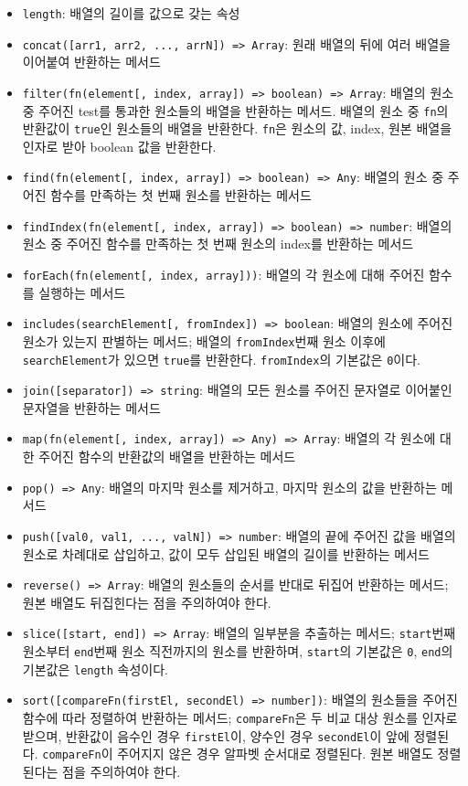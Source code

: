 \begin{itemize}
    \item \texttt{length}: 배열의 길이를 값으로 갖는 속성
    \item \texttt{concat([arr1, arr2, ..., arrN]) => Array}: 원래 배열의 뒤에 여러 배열을 이어붙여 반환하는 메서드
    \item \texttt{filter(fn(element[, index, array]) => boolean) => Array}: 배열의 원소 중 주어진 test를 통과한 원소들의 배열을 반환하는 메서드. 배열의 원소 중 \texttt{fn}의 반환값이 \texttt{true}인 원소들의 배열을 반환한다. \texttt{fn}은 원소의 값, index, 원본 배열을 인자로 받아 boolean 값을 반환한다.
    \item \texttt{find(fn(element[, index, array]) => boolean) => Any}: 배열의 원소 중 주어진 함수를 만족하는 첫 번째 원소를 반환하는 메서드
    \item \texttt{findIndex(fn(element[, index, array]) => boolean) => number}: 배열의 원소 중 주어진 함수를 만족하는 첫 번째 원소의 index를 반환하는 메서드
    \item \texttt{forEach(fn(element[, index, array]))}: 배열의 각 원소에 대해 주어진 함수를 실행하는 메서드
    \item \texttt{includes(searchElement[, fromIndex]) => boolean}: 배열의 원소에 주어진 원소가 있는지 판별하는 메서드; 배열의 \texttt{fromIndex}번째 원소 이후에 \texttt{searchElement}가 있으면 \texttt{true}를 반환한다. \texttt{fromIndex}의 기본값은 \texttt{0}이다.
    \item \texttt{join([separator]) => string}: 배열의 모든 원소를 주어진 문자열로 이어붙인 문자열을 반환하는 메서드
    \item \texttt{map(fn(element[, index, array]) => Any) => Array}: 배열의 각 원소에 대한 주어진 함수의 반환값의 배열을 반환하는 메서드
    \item \texttt{pop() => Any}: 배열의 마지막 원소를 제거하고, 마지막 원소의 값을 반환하는 메서드
    \item \texttt{push([val0, val1, ..., valN]) => number}: 배열의 끝에 주어진 값을 배열의 원소로 차례대로 삽입하고, 값이 모두 삽입된 배열의 길이를 반환하는 메서드
    \item \texttt{reverse() => Array}: 배열의 원소들의 순서를 반대로 뒤집어 반환하는 메서드; 원본 배열도 뒤집힌다는 점을 주의하여야 한다.
    \item \texttt{slice([start, end]) => Array}: 배열의 일부분을 추출하는 메서드; \texttt{start}번째 원소부터 \texttt{end}번째 원소 직전까지의 원소를 반환하며, \texttt{start}의 기본값은 \texttt{0}, \texttt{end}의 기본값은 \texttt{length} 속성이다.
    \item \texttt{sort([compareFn(firstEl, secondEl) => number])}: 배열의 원소들을 주어진 함수에 따라 정렬하여 반환하는 메서드; \texttt{compareFn}은 두 비교 대상 원소를 인자로 받으며, 반환값이 음수인 경우 \texttt{firstEl}이, 양수인 경우 \texttt{secondEl}이 앞에 정렬된다. \texttt{compareFn}이 주어지지 않은 경우 알파벳 순서대로 정렬된다. 원본 배열도 정렬된다는 점을 주의하여야 한다.
\end{itemize}

